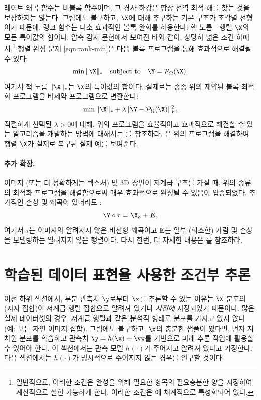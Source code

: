 \documentclass[../../book-main_ko.tex]{subfiles}
\begin{document}
레이트 왜곡 함수는 비볼록 함수이며, 그 경사 하강은 항상 전역 최적 해를 찾는 것을 보장하지는 않는다. 그럼에도 불구하고, $\X$에 대해 추구하는 기본 구조가 조각별 선형이기 때문에, 랭크 함수는 다소 효과적인 볼록 완화를 허용한다: 핵 노름---행렬 $\X$의 모든 특이값의 합이다. 압축 감지 문헌에서 보여진 바와 같이, 상당히 넓은 조건 하에서,\footnote{일반적으로, 이러한 조건은 완성을 위해 필요한 항목의 필요충분한 양을 지정하여 계산적으로 실현 가능하게 한다. 이러한 조건은 \cite{Wright-Ma-2022}에 체계적으로 특성화되어 있다.} 행렬 완성 문제 \eqref{eqn:rank-min}은 다음 볼록 프로그램을 통해 효과적으로 해결될 수 있다:
\begin{equation}
\min \|\X\|_* \quad \mbox{subject to}
\quad
\Y = \mathcal{P}_{\Omega}(\X).
\label{eqn:nuclear-min}
\end{equation}
여기서 핵 노름 $\|\X\|_*$는 $\X$의 특이값의 합이다. 실제로는 종종 위의 제약된 볼록 최적화 프로그램을 비제약 프로그램으로 변환한다:
\begin{equation}
\min \|\X\|_*  + \lambda \|\nobreak
\Y - \mathcal{P}_{\Omega}(\X)\|_F^2,
\label{eqn:nuclear-min-lagrangian}
\end{equation}
적절하게 선택된 $\lambda > 0$에 대해. 위의 프로그램을 효율적이고 효과적으로 해결할 수 있는 알고리즘을 개발하는 방법에 대해서는 \cite{Wright-Ma-2022}를 참조하라.
은 위의 프로그램을 해결하여 행렬 $\hat{\X}$가 실제로 복구된 실제 예를 보여준다.

\paragraph{추가 확장.}
이미지 (또는 더 정확하게는 텍스처) 및 3D 장면이 저계급 구조를 가질 때, 위의 종류의 최적화 프로그램을 해결함으로써 매우 효과적으로 완성될 수 있음이 입증되었다. 추가적인 손상 및 왜곡이 있더라도 \cite{Zhang2010TILTTI,Liang-ECCV2012,Yi_2023_ICCV}:
\begin{equation}
    \Y \circ \tau = \X_o + \boldsymbol{E},
\end{equation}
여기서 $\tau$는 이미지의 알려지지 않은 비선형 왜곡이고 $\boldsymbol{E}$는 일부 (희소한) 가림 및 손상을 모델링하는 알려지지 않은 행렬이다. 다시 한번, 더 자세한 내용은 \cite{Wright-Ma-2022}를 참조하라.

\section{학습된 데이터 표현을 사용한 조건부 추론}
이전 하위 섹션에서, 부분 관측치 $\y$로부터 $\x$를 추론할 수 있는 이유는 $\X$ 분포의 (지지 집합)이 저계급 행렬 집합으로 알려져 있거나 {\em 사전에} 지정되었기 때문이다. 많은 실제 데이터셋의 경우, 저계급 행렬과 같은 분석적 형태로 분포를 가지고 있지 않다 (예: 모든 자연 이미지 집합). 그럼에도 불구하고, $\x$의 충분한 샘플이 있다면, 먼저 저차원 분포를 학습하고 관측치 $\y = h(\x) + \vw$를 기반으로 미래 추론 작업에 활용할 수 있어야 한다. 이 섹션에서는 관측 모델 $h(\cdot)$가 주어지고 알려져 있다고 가정한다. 다음 섹션에서는 $h(\cdot)$가 명시적으로 주어지지 않는 경우를 연구할 것이다.
\end{document}
